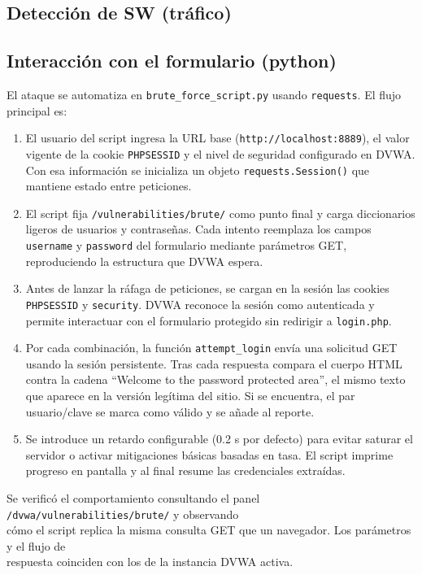\documentclass[letterpaper,12pt]{article}
\let\origsubsection\subsection
\renewcommand{\subsection}{\FloatBarrier\origsubsection}
\begin{document}
\subsection{Detección de SW (tráfico)}

\subsection{Interacción con el formulario (python)}

El ataque se automatiza en \verb|brute_force_script.py| usando \verb|requests|. El flujo principal es:
\begin{enumerate}
    \item El usuario del script ingresa la URL base (\verb|http://localhost:8889|), el valor vigente de la cookie \verb|PHPSESSID| y el nivel de seguridad configurado en DVWA. Con esa información se inicializa un objeto \verb|requests.Session()| que mantiene estado entre peticiones.
    \item El script fija \verb|/vulnerabilities/brute/| como punto final y carga diccionarios ligeros de usuarios y contraseñas. Cada intento reemplaza los campos \verb|username| y \verb|password| del formulario mediante parámetros GET, reproduciendo la estructura que DVWA espera.
    \item Antes de lanzar la ráfaga de peticiones, se cargan en la sesión las cookies \verb|PHPSESSID| y \verb|security|. DVWA reconoce la sesión como autenticada y permite interactuar con el formulario protegido sin redirigir a \verb|login.php|.
    \item Por cada combinación, la función \verb|attempt_login| envía una solicitud GET usando la sesión persistente. Tras cada respuesta compara el cuerpo HTML contra la cadena ``Welcome to the password protected area'', el mismo texto que aparece en la versión legítima del sitio. Si se encuentra, el par usuario/clave se marca como válido y se añade al reporte.
    \item Se introduce un retardo configurable (0.2 s por defecto) para evitar saturar el servidor o activar mitigaciones básicas basadas en tasa. El script imprime progreso en pantalla y al final resume las credenciales extraídas.
\end{enumerate}

Se verificó el comportamiento consultando el panel \verb|/dvwa/vulnerabilities/brute/| y observando \\
cómo el script replica la misma consulta GET que un navegador. Los parámetros y el flujo de \\
respuesta coinciden con los de la instancia DVWA activa.
\end{document}
